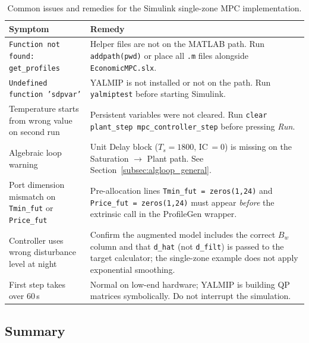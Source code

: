 \begin{table}[htbp]
	\centering
	\caption{Common issues and remedies for the Simulink single-zone MPC
		implementation.}
	\label{tab:troubleshoot}
	\begin{tabular}{>{\small}p{4.8cm} >{\small}p{8.8cm}}
		\toprule
		\textbf{Symptom} & \textbf{Remedy} \\
		\midrule
		\texttt{Function not found: get\_profiles} &
		Helper files are not on the MATLAB path.  Run \texttt{addpath(pwd)} or
		place all \texttt{.m} files alongside \texttt{EconomicMPC.slx}. \\[6pt]
		\texttt{Undefined function 'sdpvar'} &
		YALMIP is not installed or not on the path.  Run \texttt{yalmiptest}
		before starting Simulink. \\[6pt]
		Temperature starts from wrong value on second run &
		Persistent variables were not cleared.  Run
		\texttt{clear plant\_step mpc\_controller\_step} before pressing
		\textit{Run}. \\[6pt]
		Algebraic loop warning &
		Unit Delay block ($T_s=1800$, IC\,$=0$) is missing on the Saturation
		$\to$ Plant path.  See Section~\ref{subsec:algloop_general}. \\[6pt]
		Port dimension mismatch on \texttt{Tmin\_fut} or \texttt{Price\_fut} &
		Pre-allocation lines \texttt{Tmin\_fut = zeros(1,24)} and
		\texttt{Price\_fut = zeros(1,24)} must appear \emph{before} the
		extrinsic call in the ProfileGen wrapper. \\[6pt]
		Controller uses wrong disturbance level at night &
		Confirm the augmented model includes the correct $B_w$ column and
		that \texttt{d\_hat} (not \texttt{d\_filt}) is passed to the target
		calculator; the single-zone example does not apply exponential
		smoothing. \\[6pt]
		First step takes over 60\,s &
		Normal on low-end hardware; YALMIP is building QP matrices
		symbolically.  Do not interrupt the simulation. \\
		\bottomrule
	\end{tabular}
\end{table}


\subsection{Summary}
\label{subsec:summary}
% 

